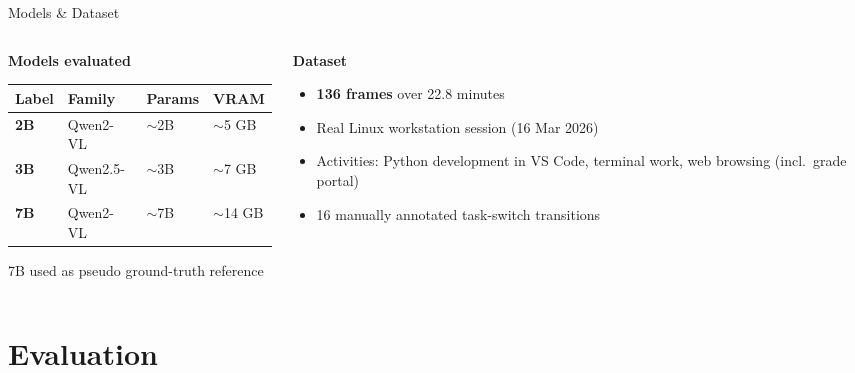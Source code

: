 \documentclass[10pt, aspectratio=169]{beamer}
\begin{document}
\begin{frame}{Models \& Dataset}
  \begin{columns}[T]
    \begin{column}{0.52\textwidth}
      \textbf{Models evaluated}
      \medskip

      \begin{tabular}{llll}
        \toprule
        Label & Family & Params & VRAM \\
        \midrule
        \textcolor{col2b}{\textbf{2B}} & Qwen2-VL   & $\sim$2B & $\sim$5 GB \\
        \textcolor{col3b}{\textbf{3B}} & Qwen2.5-VL & $\sim$3B & $\sim$7 GB \\
        \textcolor{col7b}{\textbf{7B}} & Qwen2-VL   & $\sim$7B & $\sim$14 GB \\
        \bottomrule
      \end{tabular}

      \vspace{0.4em}
      {\small 7B used as pseudo ground-truth reference}
    \end{column}
    \begin{column}{0.45\textwidth}
      \textbf{Dataset}
      \begin{itemize}
        \item \textbf{136 frames} over 22.8 minutes
        \item Real Linux workstation session (16 Mar 2026)
        \item Activities: Python development in VS Code, terminal work, web browsing (incl.\ grade portal)
        \item 16 manually annotated task-switch transitions
      \end{itemize}
    \end{column}
  \end{columns}
\end{frame}

\section{Evaluation}
\end{document}

